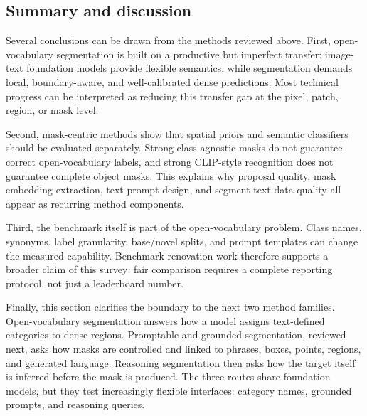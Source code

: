 \subsection{Summary and discussion}

Several conclusions can be drawn from the methods reviewed above. First, open-vocabulary segmentation is built on a productive but imperfect transfer: image-text foundation models provide flexible semantics, while segmentation demands local, boundary-aware, and well-calibrated dense predictions. Most technical progress can be interpreted as reducing this transfer gap at the pixel, patch, region, or mask level.

Second, mask-centric methods show that spatial priors and semantic classifiers should be evaluated separately. Strong class-agnostic masks do not guarantee correct open-vocabulary labels, and strong CLIP-style recognition does not guarantee complete object masks. This explains why proposal quality, mask embedding extraction, text prompt design, and segment-text data quality all appear as recurring method components.

Third, the benchmark itself is part of the open-vocabulary problem. Class names, synonyms, label granularity, base/novel splits, and prompt templates can change the measured capability. Benchmark-renovation work therefore supports a broader claim of this survey: fair comparison requires a complete reporting protocol, not just a leaderboard number.

Finally, this section clarifies the boundary to the next two method families. Open-vocabulary segmentation answers how a model assigns text-defined categories to dense regions. Promptable and grounded segmentation, reviewed next, asks how masks are controlled and linked to phrases, boxes, points, regions, and generated language. Reasoning segmentation then asks how the target itself is inferred before the mask is produced. The three routes share foundation models, but they test increasingly flexible interfaces: category names, grounded prompts, and reasoning queries.
